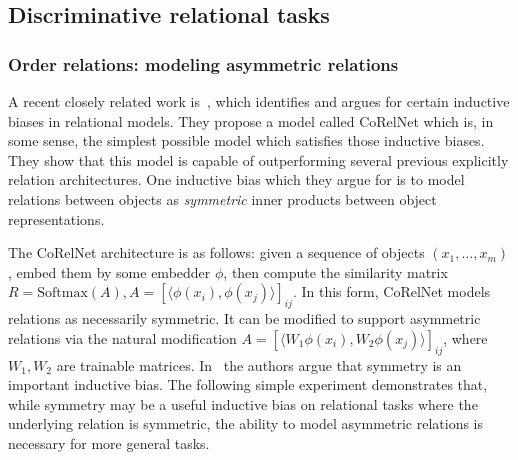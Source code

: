 \subsection{Discriminative relational tasks}\label{ssec:experiments_discriminative}
\subsubsection{Order relations: modeling asymmetric relations}\label{sssec:exp_order_relation}
A recent closely related work is~\citep{kerg2022neural}, which identifies and argues for certain inductive biases in relational models. They propose a model called CoRelNet which is, in some sense, the simplest possible model which satisfies those inductive biases. They show that this model is capable of outperforming several previous explicitly relation architectures. One inductive bias which they argue for is to model relations between objects as \textit{symmetric} inner products between object representations. %

The CoRelNet architecture is as follows: given a sequence of objects $(x_1, \ldots, x_m)$, embed them by some embedder $\phi$, then compute the similarity matrix $R = \text{Softmax}(A), A = {\left[\langle\phi(x_i), \phi(x_j)\rangle\right]}_{ij}$. In this form, CoRelNet models relations as necessarily symmetric. It can be modified to support asymmetric relations via the natural modification $A = {\left[\langle W_1 \phi(x_i), W_2 \phi(x_j)\rangle\right]}_{ij}$, where $W_1, W_2$ are trainable matrices. In~\citep{kerg2022neural} the authors argue that symmetry is an important inductive bias. The following simple experiment demonstrates that, while symmetry may be a useful inductive bias on relational tasks where the underlying relation is symmetric, the ability to model asymmetric relations is necessary for more general tasks.


